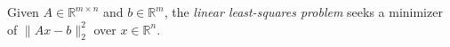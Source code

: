 
Given $A\in\mathbb R^{m\times n}$ and $b\in\mathbb R^m$, the \emph{linear least-squares problem} seeks a minimizer of $\|Ax-b\|_2^2$ over $x\in\mathbb R^n$.
